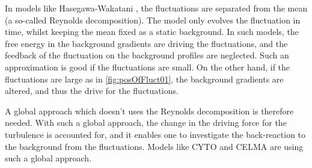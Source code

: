 In models like Hasegawa-Wakatani \cite{Hasegawa1987,Holland2007}, the fluctuations are separated from the mean (a so-called Reynolds decomposition).
The model only evolves the fluctuation in time, whilst keeping the mean fixed as a static background.
In such models, the free energy in the background gradients are driving the fluctuations, and the feedback of the fluctuation on the background profiles are neglected.
Such an approximation is good if the fluctuations are small.
On the other hand, if the fluctuations are large as in \cref{fig:posOfFluct01}, the background gradients are altered, and thus the drive for the fluctuations.

A global approach which doesn't uses the Reynolds decomposition is therefore needed.
With such a global approach, the change in the driving force for the turbulence is accounted for, and it enables one to investigate the back-reaction to the background from the fluctuations.
Models like CYTO \cite{Naulin2008,Windisch2011a,Windisch2011b} and CELMA are using such a global approach.


